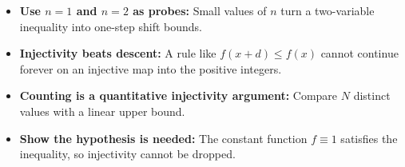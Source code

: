 \begin{takeaways}
\begin{itemize}
\item \textbf{Use \(n=1\) and \(n=2\) as probes:} Small values of \(n\) turn a two-variable inequality into one-step shift bounds.
\item \textbf{Injectivity beats descent:} A rule like \(f(x+d)\le f(x)\) cannot continue forever on an injective map into the positive integers.
\item \textbf{Counting is a quantitative injectivity argument:} Compare \(N\) distinct values with a linear upper bound.
\item \textbf{Show the hypothesis is needed:} The constant function \(f\equiv1\) satisfies the inequality, so injectivity cannot be dropped.
\end{itemize}
\end{takeaways}
